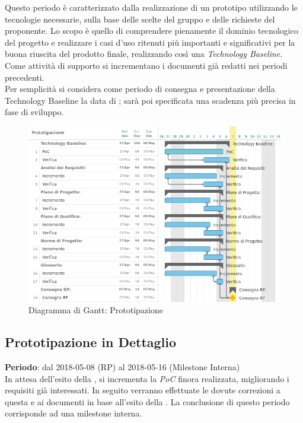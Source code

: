 Questo periodo è caratterizzato dalla realizzazione di un prototipo utilizzando le tecnologie necessarie, sulla base delle scelte del gruppo \Gruppo{} e delle richieste del proponente.
Lo scopo è quello di comprendere pienamente il dominio tecnologico del progetto e realizzare i casi d'uso ritenuti più importanti e significativi per la buona riuscita del prodotto finale, realizzando così una \emph{Technology Baseline}. \\ 
Come attività di supporto si incrementano i documenti già redatti nei periodi precedenti.\\
Per semplicità si considera come periodo di consegna e presentazione della Technology Baseline la data di \RP{}; sarà poi specificata una scadenza più precisa in fase di sviluppo.

\begin{figure}[h!]
	\centerline{\includegraphics[scale=0.55]{img/DiagrammiGantt/Prototipazione.jpg}}
	\caption{Diagramma di Gantt: Prototipazione}
	\label{fig:gantt_prot}
\end{figure}
\clearpage

\subsection{Prototipazione in Dettaglio}
\textbf{Periodo}: dal 2018-05-08 (RP) al 2018-05-16 (Milestone Interna)\\

In attesa dell'esito della \RP{}, si incrementa la \emph{PoC} finora realizzata, migliorando i requisiti già interessati. In seguito verranno effettuate le dovute correzioni a questa e ai documenti in base all'esito della \RP{}. La conclusione di questo periodo corrisponde ad una milestone interna.

